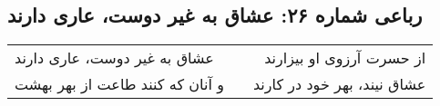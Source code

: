 \begin{center}
\section*{رباعی شماره ۲۶: عشاق به غیر دوست، عاری دارند}
\label{sec:026}
\begin{longtable}{l p{0.5cm} r}
عشاق به غیر دوست، عاری دارند
&&
از حسرت آرزوی او بیزارند
\\
و آنان که کنند طاعت از بهر بهشت
&&
عشاق نیند، بهر خود در کارند
\\
\end{longtable}
\end{center}
